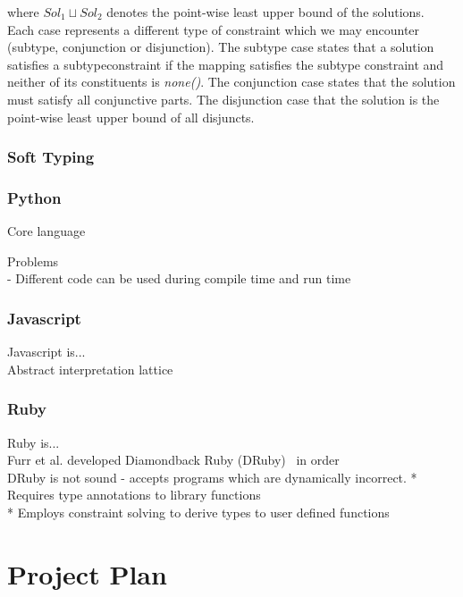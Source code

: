 \documentclass[12pt, titlepage]{article}
\begin{document}
where $Sol_1 \sqcup Sol_2$ denotes the point-wise least upper bound of the solutions. \\
Each case represents a different type of constraint which we may encounter (subtype, conjunction or disjunction). The subtype case states that a solution satisfies a subtypeconstraint if the mapping satisfies the subtype constraint and neither of its constituents is \textit{none()}. The conjunction case states that the solution must satisfy all conjunctive parts. The disjunction case that the solution is the point-wise least upper bound of all disjuncts.

\subsubsection*{Soft Typing}


\subsubsection*{Python}
Core language

Problems \\
- Different code can be used during compile time and run time 

\subsubsection*{Javascript}
Javascript is... \\
Abstract interpretation lattice \\


\subsubsection*{Ruby}
Ruby is... \\
Furr et al. developed Diamondback Ruby (DRuby)~\cite{furr09} in order  \\
DRuby is not sound - accepts programs which are dynamically incorrect.
* Requires type annotations to library functions \\
* Employs constraint solving to derive types to user defined functions

\section{Project Plan}


{}

\end{document}
